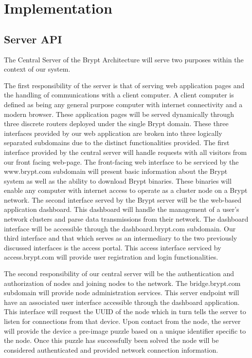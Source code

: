 \documentclass[tikz,a4paper,titlepage]{article}
\begin{document}
\section{Implementation}

\subsection{Server API} %
\label{server_api}

The Central Server of the Brypt Architecture will serve two purposes within the context of our system.

The first responsibility of the server is that of serving web application pages and the handling of communications with a client computer. A client computer is defined as being any general purpose computer with internet connectivity and a modern browser. These application pages will be served dynamically through three discrete routers deployed under the single Brypt domain. These three interfaces provided by our web application are broken into three logically separated subdomains due to the distinct functionalities provided. The first interface provided by the central server will handle requests with all visitors from our front facing web-page. The front-facing web interface to be serviced by the www.brypt.com subdomain will present basic information about the Brypt system as well as the ability to download Brypt binaries. These binaries will enable any computer with internet access to operate as a cluster node on a Brypt network. The second interface served by the Brypt server will be the web-based application dashboard. This dashboard will handle the management of a user’s network clusters and parse data transmissions from their network. The dashboard interface will be accessible through the dashboard.brypt.com subdomain. Our third interface and that which serves as an intermediary to the two previously discussed interfaces is the access portal. This access interface serviced by access.brypt.com will provide user registration and login functionalities.

The second responsibility of our central server will be the authentication and authorization of nodes and joining nodes to the network. The bridge.brypt.com subdomain will provide node administration services. This server endpoint will have an associated user interface accessible through the dashboard application. This interface will request the UUID of the node which in turn tells the server to listen for connections from that device. Upon contact from the node, the server will provide the device a pre-image puzzle based on a unique identifier specific to the node. Once this puzzle has successfully been solved the node will be considered authenticated and provided network connection information.
\end{document}

